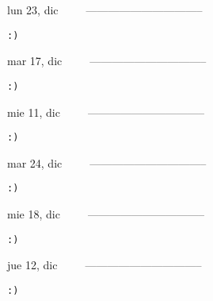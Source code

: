 \documentclass[letterpaper,10pt]{article}
\begin{document}
\begin{multicols}{3}
{lun 23, dic\ \ \ \ \ --------------------------------}
\begin{flushright}\begin{small}\texttt{:)}\end{small}\end{flushright}
\vfill
{mar 17, dic\ \ \ \ \ --------------------------------}
\begin{flushright}\begin{small}\texttt{:)}\end{small}\end{flushright}\par
\vfill
{mie 11, dic\ \ \ \ \ --------------------------------}
\begin{flushright}\begin{small}\texttt{:)}\end{small}\end{flushright}\par
\vfill
\end{multicols}
\vspace{1.05cm}

\begin{multicols}{3}
{mar 24, dic\ \ \ \ \ --------------------------------}
\begin{flushright}\begin{small}\texttt{:)}\end{small}\end{flushright}
\vfill
{mie 18, dic\ \ \ \ \ --------------------------------}
\begin{flushright}\begin{small}\texttt{:)}\end{small}\end{flushright}\par
\vfill
{jue 12, dic\ \ \ \ \ --------------------------------}
\begin{flushright}\begin{small}\texttt{:)}\end{small}\end{flushright}\par
\vfill
\end{multicols}
\vspace{1.05cm}
\end{document}
